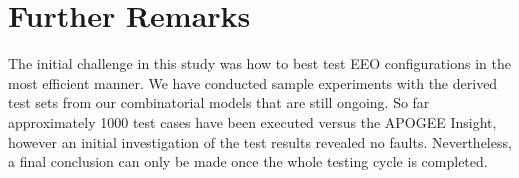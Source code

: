 \documentclass[runningheads]{llncs}
\newcommand{\apogee}{APOGEE Insight\textsuperscript{\tiny{\textregistered}}}
\begin{document}
%
%
%



\section{Further Remarks}


The initial challenge in this study was how to best test EEO configurations in the most efficient manner.
We have conducted sample experiments with the derived test sets from our combinatorial models that are still ongoing.
So far approximately 1000 test cases have been executed versus the \apogee{},
however an initial investigation of the test results revealed no faults. Nevertheless,
a final conclusion can only be made once the whole testing cycle is completed.
\end{document}
